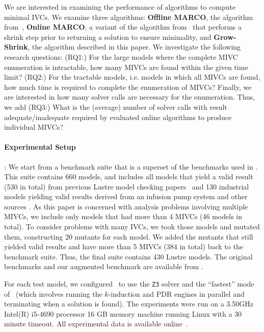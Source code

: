 We are interested in examining the performance of algorithms to compute minimal IVCs.  We examine three algorithms: \textbf{Offline MARCO}, the algorithm from~\cite{Ghass17AllIVCs}, \textbf{Online MARCO}, a variant of the algorithm from~\cite{Ghass17AllIVCs} that performs a shrink step prior to returning a solution to ensure minimality, and \textbf{Grow-Shrink}, the algorithm described in this paper.  We investigate the following research questions: (RQ1:) For the large models where the complete MIVC enumeration is intractable, 
how many MIVCs are found within the given time limit?  (RQ2:) For the tractable models, i.e. models in which all MIVCs are found, how much time is required to complete the enumeration of MIVCs?  Finally, we are interested in how many solver calls are necessary for the enumeration.  Thus, we add (RQ3:) What is the (average) number of solver calls with result adequate/inadequate required by evaluated online algorithms to produce individual MIVCs?


\paragraph{Experimental Setup}:  We start from a benchmark suite that is a superset of the benchmarks used in \cite{Ghass17AllIVCs}. This suite contains 660 models, and includes all models that yield a valid result (530 in total) from previous Lustre model checking papers~\cite{Hagen08:FMCAD,piskac2016} and 130 industrial models yielding valid results derived from an infusion pump system \cite{hilt2013} and other sources \cite{piskac2016,NFM2015:backes}.
As this paper is concerned with analysis problems involving multiple MIVCs, we include only models that had more than 4 MIVCs (46 models in total).  To consider problems with many IVCs, we took those models and mutated them, constructing 20 mutants for each model.  We added the mutants that still yielded valid results and have more than 5 MIVCs (384 in total) back to the benchmark suite.
Thus, the final suite contains 430 Lustre models. The original benchmarks and our augmented benchmark are available from \cite{bench}.

For each test model, we configured \jkind\ to use the \texttt{Z3} solver and the ``fastest'' mode of \jkind\ (which involves running the $k$-induction and PDR engines in parallel and terminating when a solution is found). The experiments were run on a  3.50GHz  Intel(R) i5-4690 processor 16 GB memory machine running Linux with a 30 minute timeout.  All experimental data is available online~\cite{expr}.




